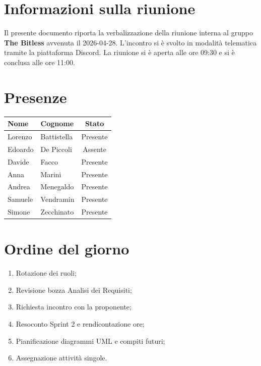 \documentclass[a4paper, 10pt, colorlinks=true, linkcolor=black, urlcolor=blue, citecolor=blue, hidelinks]{article}
\begin{document}
\newcommand{\titolo}{Verbale interno}
\newcommand{\dataverbale}{2026-04-28}
\newcommand{\dataversione}{2026-04-28}
\newcommand{\versione}{1.0.0}
\newcommand{\stato}{Stesura}
\newcommand{\destinatari}{The Bitless, prof. Tullio Vardanega, prof. Riccardo Cardin}
\def\templatedir{../../../../templates}

\begin{titlepage}

\end{titlepage}
\newpage
\tableofcontents 

\newpage
\section{Informazioni sulla riunione}
Il presente documento riporta la verbalizzazione della riunione interna al gruppo \textbf{The Bitless} avvenuta il \dataverbale{}. L'incontro si è svolto in modalità telematica tramite la piattaforma Discord. La riunione si è aperta alle ore 09:30 e si è conclusa alle ore 11:00.

\section{Presenze}
\begin{center}
\begin{tabular}{|l|l|c|}
\hline
\textbf{Nome} & \textbf{Cognome} & \textbf{Stato} \\
\hline
Lorenzo & Battistella & Presente \\
Edoardo & De Piccoli & Assente \\
Davide & Facco & Presente \\
Anna & Marini & Presente \\
Andrea & Menegaldo & Presente \\
Samuele & Vendramin & Presente \\
Simone & Zecchinato & Presente \\
\hline
\end{tabular}
\end{center}

\section{Ordine del giorno}
\begin{enumerate}
    \item Rotazione dei ruoli;
    \item Revisione bozza Analisi dei Requisiti;
    \item Richiesta incontro con la proponente;
    \item Resoconto Sprint 2 e rendicontazione ore;
    \item Pianificazione diagrammi UML e compiti futuri;
    \item Assegnazione attività singole.
\end{enumerate}
\end{document}
